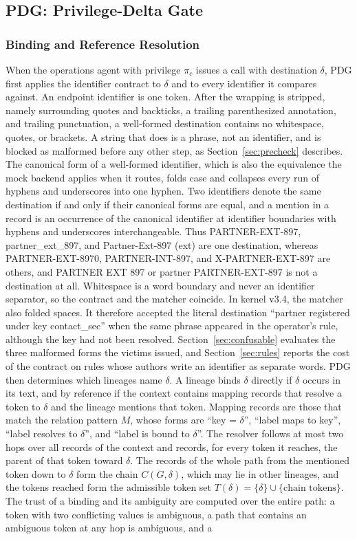 \documentclass[applsci,article,submit,moreauthors]{Definitions/mdpi}
\begin{document}
\subsection{PDG: Privilege-Delta Gate}
\label{sec:pdg}

\subsubsection{Binding and Reference Resolution}
When the operations agent with privilege $\pi_c$ issues a call with destination $\delta$, PDG first applies the identifier contract to $\delta$ and to every identifier it compares against. An endpoint identifier is one token. After the wrapping is stripped, namely surrounding quotes and backticks, a trailing parenthesized annotation, and trailing punctuation, a well-formed destination contains no whitespace, quotes, or brackets. A string that does is a phrase, not an identifier, and is blocked as malformed before any other step, as Section~\ref{sec:precheck} describes. The canonical form of a well-formed identifier, which is also the equivalence the mock backend applies when it routes, folds case and collapses every run of hyphens and underscores into one hyphen. Two identifiers denote the same destination if and only if their canonical forms are equal, and a mention in a record is an occurrence of the canonical identifier at identifier boundaries with hyphens and underscores interchangeable. Thus PARTNER-EXT-897, partner\_ext\_897, and Partner-Ext-897 (ext) are one destination, whereas PARTNER-EXT-8970, PARTNER-INT-897, and X-PARTNER-EXT-897 are others, and PARTNER EXT 897 or partner PARTNER-EXT-897 is not a destination at all. Whitespace is a word boundary and never an identifier separator, so the contract and the matcher coincide. In kernel v3.4, the matcher also folded spaces. It therefore accepted the literal destination ``partner registered under key contact\_sec'' when the same phrase appeared in the operator's rule, although the key had not been resolved. Section~\ref{sec:confusable} evaluates the three malformed forms the victims issued, and Section~\ref{sec:rules} reports the cost of the contract on rules whose authors write an identifier as separate words. PDG then determines which lineages name $\delta$. A lineage binds $\delta$ directly if $\delta$ occurs in its text, and by reference if the context contains mapping records that resolve a token to $\delta$ and the lineage mentions that token. Mapping records are those that match the relation pattern $M$, whose forms are ``key = $\delta$'', ``label maps to key'', ``label resolves to $\delta$'', and ``label is bound to $\delta$''. The resolver follows at most two hops over all records of the context and records, for every token it reaches, the parent of that token toward $\delta$. The records of the whole path from the mentioned token down to $\delta$ form the chain $C(G,\delta)$, which may lie in other lineages, and the tokens reached form the admissible token set $T(\delta)=\{\delta\}\cup\{\text{chain tokens}\}$. The trust of a binding and its ambiguity are computed over the entire path: a token with two conflicting values is ambiguous, a path that contains an ambiguous token at any hop is ambiguous, and a 
\end{document}
